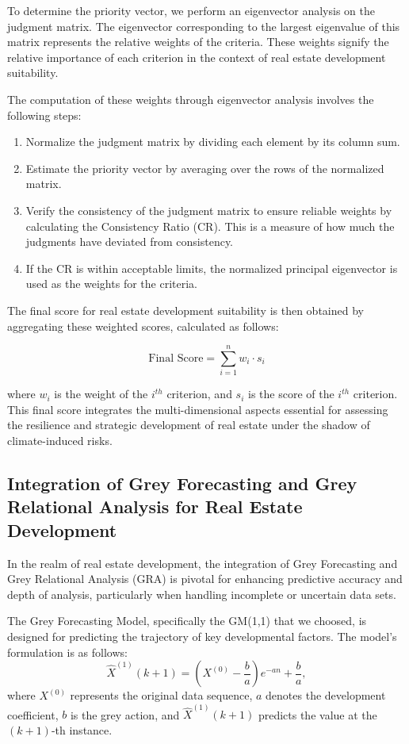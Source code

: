 \documentclass{mcmthesis}
\begin{document}
To determine the priority vector, we perform an eigenvector analysis on the judgment matrix. The eigenvector corresponding to the largest eigenvalue of this matrix represents the relative weights of the criteria. These weights signify the relative importance of each criterion in the context of real estate development suitability.

The computation of these weights through eigenvector analysis involves the following steps:

\begin{enumerate}
    \item Normalize the judgment matrix by dividing each element by its column sum.
    \item Estimate the priority vector by averaging over the rows of the normalized matrix.
    \item Verify the consistency of the judgment matrix to ensure reliable weights by calculating the Consistency Ratio (CR). This is a measure of how much the judgments have deviated from consistency.
    \item If the CR is within acceptable limits, the normalized principal eigenvector is used as the weights for the criteria.
\end{enumerate}

The final score for real estate development suitability is then obtained by aggregating these weighted scores, calculated as follows:

\[
\text{Final Score} = \sum_{i=1}^{n} w_i \cdot s_i
\]

where \( w_i \) is the weight of the \( i^{th} \) criterion, and \( s_i \) is the score of the \( i^{th} \) criterion. This final score integrates the multi-dimensional aspects essential for assessing the resilience and strategic development of real estate under the shadow of climate-induced risks.

\subsection{Integration of Grey Forecasting and Grey Relational Analysis for Real Estate Development}

In the realm of real estate development, the integration of Grey Forecasting and Grey Relational Analysis (GRA) is pivotal for enhancing predictive accuracy and depth of analysis, particularly when handling incomplete or uncertain data sets.

The Grey Forecasting Model, specifically the GM(1,1) that we choosed, is designed for predicting the trajectory of key developmental factors. The model's formulation is as follows:
\begin{equation}
\hat{X}^{(1)}(k+1) = (X^{(0)} - \frac{b}{a})e^{-an} + \frac{b}{a},
\end{equation}
where $X^{(0)}$ represents the original data sequence, $a$ denotes the development coefficient, $b$ is the grey action, and $\hat{X}^{(1)}(k+1)$ predicts the value at the $(k+1)$-th instance.
\end{document}
